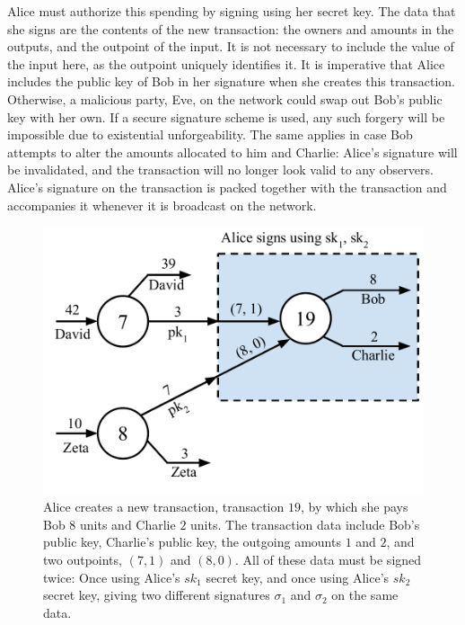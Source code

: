 Alice must authorize this spending by signing using her secret key.
The data that she signs are the contents of the new transaction:
the owners and amounts in the outputs, and the outpoint of the input.
It is not necessary to include the value of the input here, as the outpoint
uniquely identifies it. It is imperative that Alice includes the public key
of Bob in her signature when she creates this transaction. Otherwise, a malicious
party, Eve, on the network could swap out Bob's public key with her own. If a secure
signature scheme is used, any such forgery will be impossible due to existential
unforgeability. The same applies in case Bob attempts to alter the amounts allocated
to him and Charlie: Alice's signature will be invalidated, and the transaction will
no longer look valid to any observers. Alice's signature on the transaction is packed
together with the transaction and accompanies it whenever it is broadcast on the network.

\begin{figure}[h]
    \centering
    \includegraphics[width=0.65 \columnwidth,keepaspectratio]{figures/utxo-sig-multi.pdf}
    \caption{Alice creates a new transaction, transaction $19$, by which she pays Bob
             $8$ units
             and Charlie $2$ units.
             The transaction data include Bob's public key, Charlie's public key,
             the outgoing amounts $1$ and $2$, and two outpoints, $(7, 1)$ and $(8, 0)$.
             All of these data must be signed twice: Once using Alice's $sk_1$ secret key,
             and once using Alice's $sk_2$ secret key, giving two different signatures
             $\sigma_1$ and $\sigma_2$ on the same data.}
    \label{fig.utxo-sig-multi}
\end{figure}


